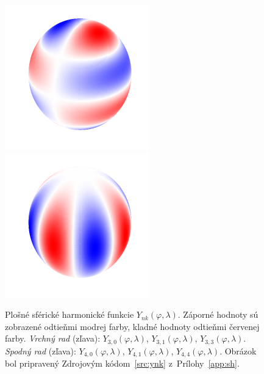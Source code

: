 \documentclass[a4paper,12pt]{book}
\begin{document}
\begin{figure}[bt]
\includegraphics{./fig-spherical-harmonic-n4-k1.pdf}
\includegraphics{./fig-spherical-harmonic-n4-k4.pdf}
\caption{Plošné sférické harmonické funkcie $Y_{nk}(\varphi, \lambda)$.
Záporné hodnoty sú zobrazené odtieňmi modrej farby, kladné hodnoty odtieňmi
červenej farby.  \textit{Vrchný rad} (zľava): $Y_{3,0}(\varphi, \lambda)$,
$Y_{3,1}(\varphi, \lambda)$, $Y_{3,3}(\varphi, \lambda)$.  \textit{Spodný rad}
(zľava): $Y_{4,0}(\varphi, \lambda)$, $Y_{4,1}(\varphi, \lambda)$,
$Y_{4,4}(\varphi, \lambda)$.  Obrázok bol pripravený Zdrojovým
kódom~\ref{src:ynk} z~Prílohy~\ref{app:sh}.}
\label{fig:sh}
\end{figure}
\end{document}
